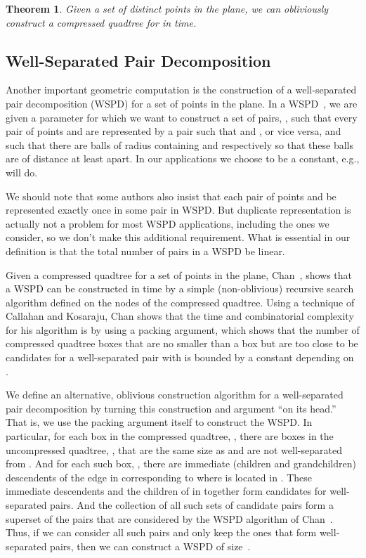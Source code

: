 \documentclass[11pt]{article}
\newtheorem{theorem}{Theorem}
\begin{document}
{\begin{theorem}
\label{thm:quadtree}
Given a set  of distinct points in the plane, we can obliviously construct a
compressed quadtree for  in  time.
\end{theorem}

\subsection{Well-Separated Pair Decomposition}
Another important geometric computation is
the construction of a well-separated pair decomposition (WSPD) for a set 
of  points in the plane.
In a WSPD~\cite{ck-dmpsa-95}, 
we are given a parameter  for
which we want to construct a set of pairs,
, 
such that every pair of points  and  are represented by a pair
 such that  and , or vice versa,
and such that there are balls of radius  containing  and 
respectively so that these balls are of distance at least  apart.
In our applications we choose  to be a constant, e.g.,  will do.

We should note that some authors also insist 
that each pair of points  and 
be represented exactly once in some  pair in WSPD.
But duplicate
representation is actually not a problem for most WSPD applications,
including the ones we consider, so we don't make this additional
requirement. What is essential in our definition 
is that the total number of pairs in a WSPD be linear.

Given a compressed quadtree for a set  of  points
in the plane, Chan~\cite{c-wspdl-08}, shows that a WSPD
can be constructed in  time by a simple
(non-oblivious) recursive search algorithm defined on the nodes of the
compressed quadtree. 
Using a technique of Callahan and Kosaraju,
Chan shows that the time and combinatorial complexity for his algorithm is 
 by using a packing argument, which shows that the number of compressed
quadtree boxes that are no smaller than a box  but are too close to be
candidates for a well-separated pair with  is bounded by a constant
depending on .

We define an alternative, oblivious construction algorithm for a
well-separated pair decomposition by turning this construction and argument
``on its head.''
That is, we use the packing argument itself to construct the WSPD.
In particular, for each box  in the compressed quadtree, , there are
 boxes in the uncompressed quadtree, ,
that are the same size as  and are not well-separated from . And for
each such box, , there are  immediate (children and grandchildren)
descendents of the edge in  corresponding to where  is located in
.
These immediate descendents and the children of  in 
together form candidates for well-separated pairs. And the collection 
of all such sets of candidate pairs form a superset of the pairs that are
considered by the WSPD algorithm of
Chan~\cite{c-wspdl-08}.
Thus, if we can consider all such pairs and only keep the ones that form
well-separated pairs, then we can construct a WSPD
of size~.

}
\end{document}
